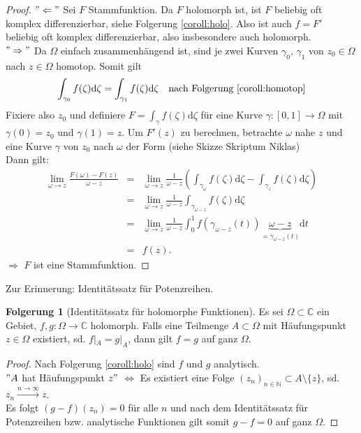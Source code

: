 \documentclass[11pt,titlepage]{article}
\theoremstyle{definition}
\newtheorem{corollary}[theorem]{Folgerung}
\theoremstyle{remark}
\begin{document}
	\begin{proof}
		$"\Leftarrow"$ Sei $F$ Stammfunktion. Da $F$ holomorph ist, ist $F$ beliebig oft komplex 
		differenzierbar, siehe Folgerung \ref{coroll:holo}. Also ist auch $f=F'$ beliebig oft komplex 
		differenzierbar, also insbesondere auch holomorph. \\
		$"\Rightarrow"$ Da $\Omega$ einfach zusammenhängend ist, sind je zwei Kurven 
		$\gamma_0$, $\gamma_1$ von $z_0\in\Omega$ nach $z\in\Omega$ homotop. Somit gilt 
		\[ \int_{\gamma_0} f(\zeta)\mathrm{d}\zeta =\int_{\gamma_1}f(\zeta)\mathrm{d}\zeta 
		\quad \text{nach Folgerung \ref{coroll:homotop}} \]
		Fixiere also $z_0$ und definiere $F=\int_{\gamma} f(\zeta)\mathrm{d}\zeta$ für eine Kurve 
		$\gamma:[0,1]\to\Omega$ mit $\gamma(0)=z_0$ und $\gamma(1)=z$. 
		Um $F'(z)$ zu berechnen, betrachte $\omega$ nahe $z$ und eine Kurve $\gamma$ von $z_0$ 
		nach $\omega$ der Form (siehe Skizze Skriptum Niklas) \\
		Dann gilt:
		\begin{eqnarray*}
			\lim_{\omega\to z}\frac{F(\omega)-F(z)}{\omega -z} &=&
			\lim_{\omega\to z}\frac{1}{\omega -z}\left( \int_{\gamma_{\omega}}f(\zeta)\mathrm{d}\zeta -
			\int_{\gamma_z}f(\zeta)\mathrm{d}\zeta \right) \\
			&=&\lim_{\omega\to z}\frac{1}{\omega -z}\int_{\gamma_{\omega -z}}
			f(\zeta)\mathrm{d}\zeta \\
			&=&\lim_{\omega\to z}\frac{1}{\omega -z}\int_0^1 f(\gamma_{\omega -z}(t))
			\underbrace{\omega -z}_{=\dot{\gamma}_{\omega -z}(t)}\mathrm{d}t \\
			&=& f(z).
		\end{eqnarray*}
		$\Rightarrow$ $F$ ist eine Stammfunktion.
	\end{proof}
	
	Zur Erinnerung: Identitätssatz für Potenzreihen.
	
	\begin{corollary}[Identitätssatz für holomorphe Funktionen]
		Es sei $\Omega\subset\mathbb{C}$ ein Gebiet, $f,g:\Omega\to\mathbb{C}$ holomorph. Falls 
		eine Teilmenge $A\subset\Omega$ mit Häufungspunkt $z\in\Omega$ existiert, sd. 
		$f|_A =g|_A$, dann gilt $f=g$ auf ganz $\Omega$.
	\end{corollary}
	
	\begin{proof} 
		Nach Folgerung \ref{coroll:holo} sind $f$ und $g$ analytisch. \\
		$"A$ hat Häufungspunkt $z"$ $\Leftrightarrow$ Es existiert eine Folge $(z_n)_{n\in\mathbb{N}}
		\subset A\setminus\{ z\}$, sd. $z_n\xrightarrow{n\to\infty} z$. \\
		Es folgt $(g-f)(z_n)=0$ für alle $n$ und nach dem Identitätssatz für Potenzreihen bzw. 
		analytische Funktionen gilt somit $g-f=0$ auf ganz $\Omega$.
	\end{proof}
	
\end{document}
